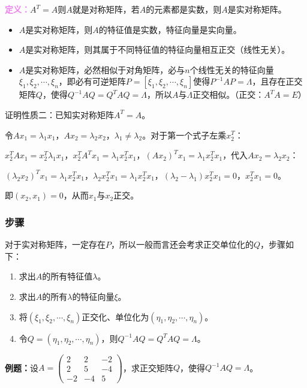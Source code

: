 \documentclass[UTF8, 12pt]{ctexart}
\begin{document}
\textcolor{violet}{\textbf{定义：}}$A^T=A$则$A$就是对称矩阵，若$A$的元素都是实数，则$A$是实对称矩阵。

\begin{itemize}
\item $A$是实对称矩阵，则$A$的特征值是实数，特征向量是实向量。
\item $A$是实对称矩阵，则其属于不同特征值的特征向量相互正交（线性无关）。
\item $A$是实对称矩阵，必然相似于对角矩阵，必与$n$个线性无关的特征向量$\xi_1,\xi_2,\cdots,\xi_n$，即必有可逆矩阵$P=[\xi_1,\xi_2,\cdots,\xi_n]$使得$P^{-1}AP=\Lambda$，且存在正交矩阵$Q$，使得$Q^{-1}AQ=Q^TAQ=\Lambda$，所以$A$与$\Lambda$正交相似。（正交：$A^TA=E$）
\end{itemize}

证明性质二：已知实对称矩阵$A^T=A$。

令$Ax_1=\lambda_1x_1$，$Ax_2=\lambda_2x_2$，$\lambda_1\neq\lambda_2$。对于第一个式子左乘$x_2^T$：

$x_2^TAx_1=x_2^T\lambda_1x_1$，$x_2^TA^Tx_1=\lambda_1x_2^Tx_1$，$(Ax_2)^Tx_1=\lambda_1x_2^Tx_1$，代入$Ax_2=\lambda_2x_2$：

$(\lambda_2x_2)^Tx_1=\lambda_1x_2^Tx_1$，$\lambda_2x_2^Tx_1=\lambda_1x_2^Tx_1$，$(\lambda_2-\lambda_1)x_2^Tx_1=0$，$x_2^Tx_1=0$。

即$(x_2,x_1)=0$，从而$x_1$与$x_2$正交。

\subsubsection{步骤}

对于实对称矩阵，一定存在$P$，所以一般而言还会考求正交单位化的$Q$，步骤如下：

\begin{enumerate}
\item 求出$A$的所有特征值$\lambda$。
\item 求出$A$的所有$\lambda$的特征向量$\xi$。
\item 将$(\xi_1,\xi_2,\cdots,\xi_n)$正交化、单位化为$(\eta_1,\eta_2,\cdots,\eta_n)$。
\item 令$Q=(\eta_1,\eta_2,\cdots,\eta_n)$，则$Q^{-1}AQ=Q^TAQ=\Lambda$。
\end{enumerate}

\textbf{例题：}设$A=\left(\begin{array}{ccc}
2 & 2 & -2 \\
2 & 5 & -4 \\
-2 & -4 & 5
\end{array}\right)$，求正交矩阵$Q$，使得$Q^{-1}AQ=\Lambda$。\medskip
\end{document}
